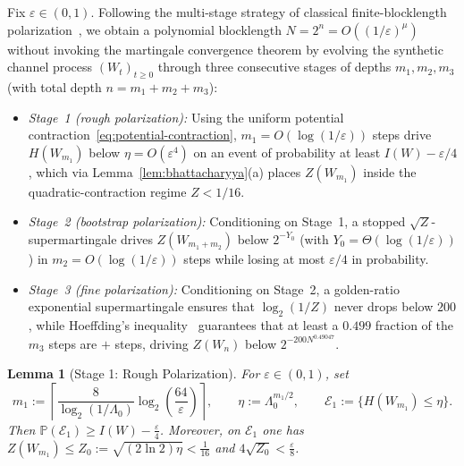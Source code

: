 \documentclass[10pt,a4paper]{article}
\numberwithin{equation}{section}
\theoremstyle{plain}
\newtheorem{lemma}[theorem]{Lemma}
\theoremstyle{definition}
\theoremstyle{remark}
\newcommand{\cE}{\mathcal{E}}
\newcommand{\bP}{\mathbb{P}}
\begin{document}
Fix $\varepsilon \in (0,1)$. Following the multi-stage strategy of classical finite-blocklength polarization~\cite{GuruswamiXia2015,HassaniAlishahiUrbanke2014,MondelliHassaniUrbanke2016}, we obtain a polynomial blocklength $N = 2^n = O((1/\varepsilon)^{\mu})$ without invoking the martingale convergence theorem by evolving the synthetic channel process $(W_t)_{t \ge 0}$ through three consecutive stages of depths $m_1, m_2, m_3$ (with total depth $n = m_1 + m_2 + m_3$):
\begin{itemize}
\item \emph{Stage~1 (rough polarization):} Using the uniform potential contraction~\eqref{eq:potential-contraction}, $m_1 = O(\log(1/\varepsilon))$ steps drive $H(W_{m_1})$ below $\eta = O(\varepsilon^4)$ on an event of probability at least $I(W) - \varepsilon/4$, which via Lemma~\ref{lem:bhattacharyya}(a) places $Z(W_{m_1})$ inside the quadratic-contraction regime $Z < 1/16$.
\item \emph{Stage~2 (bootstrap polarization):} Conditioning on Stage~1, a stopped $\sqrt{Z}$-supermartingale drives $Z(W_{m_1 + m_2})$ below $2^{-Y_0}$ (with $Y_0 = \Theta(\log(1/\varepsilon))$) in $m_2 = O(\log(1/\varepsilon))$ steps while losing at most $\varepsilon/4$ in probability.
\item \emph{Stage~3 (fine polarization):} Conditioning on Stage~2, a golden-ratio exponential supermartingale ensures that $\log_2(1/Z)$ never drops below $200$, while Hoeffding's inequality~\cite{Hoeffding1963} guarantees that at least a $0.499$ fraction of the $m_3$ steps are $+$ steps, driving $Z(W_n)$ below $2^{-200 N^{0.49047}}$.
\end{itemize}

\begin{lemma}[Stage 1: Rough Polarization]\label{lem:stage1}
For $\varepsilon \in (0,1)$, set
\[
m_1 := \left\lceil \frac{8}{\log_2(1/\Lambda_0)} \log_2\!\left(\frac{64}{\varepsilon}\right) \right\rceil, \qquad
\eta := \Lambda_0^{m_1/2}, \qquad
\cE_1 := \bigl\{H(W_{m_1}) \le \eta\bigr\}.
\]
Then $\bP(\cE_1) \ge I(W) - \frac{\varepsilon}{4}$. Moreover, on $\cE_1$ one has $Z(W_{m_1}) \le Z_0 := \sqrt{(2\ln 2)\eta} < \frac{1}{16}$ and $4\sqrt{Z_0} < \frac{\varepsilon}{8}$.
\end{lemma}
\end{document}
